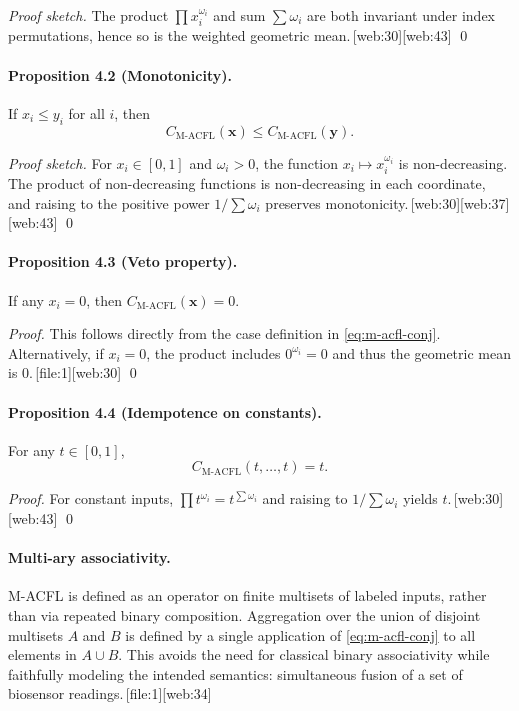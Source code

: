 \documentclass[11pt]{article}
\begin{document}
\emph{Proof sketch.} 
The product $\prod x_i^{\omega_i}$ and sum $\sum \omega_i$ are both invariant under index permutations, hence so is the weighted geometric mean.\,[web:30][web:43] 
\qed

\paragraph{Proposition 4.2 (Monotonicity).}
If $x_i \le y_i$ for all $i$, then
\[
C_{\text{M-ACFL}}(\mathbf{x}) \le C_{\text{M-ACFL}}(\mathbf{y}).
\]

\emph{Proof sketch.}
For $x_i \in [0,1]$ and $\omega_i>0$, the function $x_i \mapsto x_i^{\omega_i}$ is non-decreasing. 
The product of non-decreasing functions is non-decreasing in each coordinate, and raising to the positive power $1/\sum \omega_i$ preserves monotonicity.\,[web:30][web:37][web:43] 
\qed

\paragraph{Proposition 4.3 (Veto property).}
If any $x_i = 0$, then $C_{\text{M-ACFL}}(\mathbf{x}) = 0$.

\emph{Proof.}
This follows directly from the case definition in \eqref{eq:m-acfl-conj}. 
Alternatively, if $x_i=0$, the product includes $0^{\omega_i}=0$ and thus the geometric mean is $0$.\,[file:1][web:30] 
\qed

\paragraph{Proposition 4.4 (Idempotence on constants).}
For any $t \in [0,1]$,
\[
C_{\text{M-ACFL}}(t,\dots,t) = t.
\]

\emph{Proof.}
For constant inputs, $\prod t^{\omega_i} = t^{\sum \omega_i}$ and raising to $1/\sum\omega_i$ yields $t$.\,[web:30][web:43] 
\qed

\paragraph{Multi-ary associativity.}
M-ACFL is defined as an operator on finite multisets of labeled inputs, rather than via repeated binary composition. 
Aggregation over the union of disjoint multisets $A$ and $B$ is defined by a single application of \eqref{eq:m-acfl-conj} to all elements in $A\cup B$. 
This avoids the need for classical binary associativity while faithfully modeling the intended semantics: simultaneous fusion of a set of biosensor readings.\,[file:1][web:34] 
\end{document}
